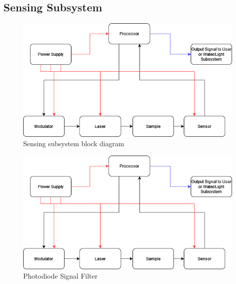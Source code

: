\subsection{Sensing Subsystem}
\begin{figure}[H]
    \caption{Sensing subsystem block diagram}
    \centering
    \includegraphics[width=\textwidth]{images/IRSensorBlockDiagram.png}
\end{figure}

\begin{figure}[H]
    \caption{Photodiode Signal Filter}
    \centering
    \includegraphics[width=\textwidth]{images/IRSensorBlockDiagram.png}
\end{figure}